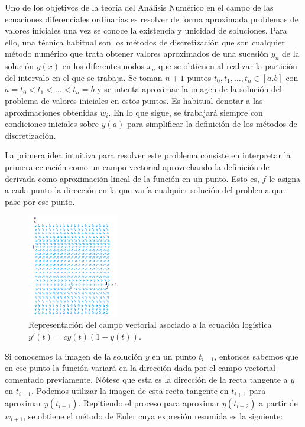 \documentclass{article}
\theoremstyle{theorem-style}  %
\theoremstyle{definition-style}
\theoremstyle{example-style}
\begin{document}
	Uno de los objetivos de la teoría del Análisis Numérico en el campo de las ecuaciones diferenciales ordinarias es resolver de forma aproximada problemas de valores iniciales una vez se conoce la existencia y unicidad de soluciones. Para ello, una técnica habitual son los métodos de discretización que son cualquier método numérico que trata obtener valores aproximados de una sucesión $y_n$ de la solución $y(x)$ en los diferentes nodos $x_n$ que se obtienen al realizar la partición del intervalo en el que se trabaja. Se toman $n+1$ puntos $t_0, t_1, \ldots, t_n \in [a.b]$ con $a = t_0 < t_1 < \ldots < t_n = b$ y se intenta aproximar la imagen de la solución del problema de valores iniciales en estos puntos. Es habitual denotar a las aproximaciones obtenidas $w_i$. En lo que sigue, se trabajará siempre con condiciones iniciales sobre $y(a)$ para simplificar la definición de los métodos de discretización. 	
	
	La primera idea intuitiva para resolver este problema consiste en interpretar la primera ecuación como un campo vectorial aprovechando la definición de derivada como aproximación lineal de la función en un punto. Esto es, $f$ le asigna a cada punto la dirección en la que varía cualquier solución del problema que pase por ese punto.

	\begin{figure}[h]
		\centering
		\includegraphics[width=4cm]{./Images/interpret-pvi.png}
		\caption{Representación del campo vectorial asociado a la ecuación logística $y'(t) = c y(t) (1 - y(t))$.} 
		\label{fig:interpret-pvi}
	\end{figure}

	Si conocemos la imagen de la solución $y$ en un punto $t_{i-1}$, entonces sabemos que en ese punto la función variará en la dirección dada por el campo vectorial comentado previamente. Nótese que esta es la dirección de la recta tangente a $y$ en $t_{i-1}$. Podemos utilizar la imagen de esta recta tangente en $t_{i+1}$ para aproximar $y(t_{i+1})$. Repitiendo el proceso para aproximar $y(t_{i+2})$ a partir de $w_{i+1}$, se obtiene el método de Euler cuya expresión resumida es la siguiente:
\end{document}
